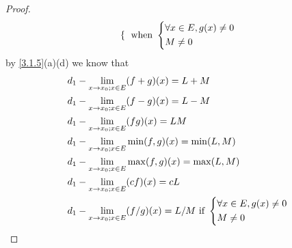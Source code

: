 \begin{proof}
\begin{align*}
\begin{dcases}
                                                     \end{dcases} \text{ when } \begin{dcases}
                                                                                  \forall x \in E, g(x) \neq 0 \\
                                                                                  M \neq 0
                                                                                \end{dcases}
  \end{align*}
  by \cref{3.1.5}(a)(d) we know that
  \begin{align*}
     & d_1 - \lim_{x \to x_0 ; x \in E} (f + g)(x) = L + M                                          \\
     & d_1 - \lim_{x \to x_0 ; x \in E} (f - g)(x) = L - M                                          \\
     & d_1 - \lim_{x \to x_0 ; x \in E} (fg)(x) = LM                                                \\
     & d_1 - \lim_{x \to x_0 ; x \in E} \min(f, g)(x) = \min(L, M)                                  \\
     & d_1 - \lim_{x \to x_0 ; x \in E} \max(f, g)(x) = \max(L, M)                                  \\
     & d_1 - \lim_{x \to x_0 ; x \in E} (cf)(x) = cL                                                \\
     & d_1 - \lim_{x \to x_0 ; x \in E} (f / g)(x) = L / M \text{ if } \begin{dcases}
                                                                         \forall x \in E, g(x) \neq 0 \\
                                                                         M \neq 0
                                                                       \end{dcases}
  \end{align*}
\end{proof}